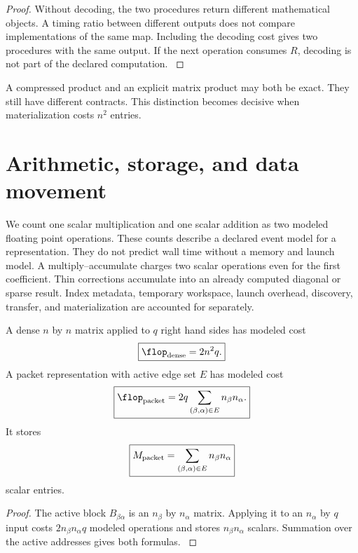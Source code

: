 \begin{proof}\label{main:proof:004}
Without decoding, the two procedures return different mathematical objects. A timing ratio between different outputs does not compare implementations of the same map. Including the decoding cost gives two procedures with the same output. If the next operation consumes \(R\), decoding is not part of the declared computation.
\label{main:proof:004:end}\end{proof}

\begin{remark}\label{main:remark:001}\label{rem:semantic_boundary}
A compressed product and an explicit matrix product may both be exact. They still have different contracts. This distinction becomes decisive when materialization costs \(n^2\) entries.
\end{remark}

\section{Arithmetic, storage, and data movement}\label{main:section:003}\label{sec:cost}

We count one scalar multiplication and one scalar addition as two modeled floating point operations. These counts describe a declared event model for a representation. They do not predict wall time without a memory and launch model. A multiply--accumulate charges two scalar operations even for the first coefficient. Thin corrections accumulate into an already computed diagonal or sparse result. Index metadata, temporary workspace, launch overhead, discovery, transfer, and materialization are accounted for separately.

\begin{theorem}\label{main:theorem:003}\label{thm:packet_counts}
A dense \(n\) by \(n\) matrix applied to \(q\) right hand sides has modeled cost
\[
\boxed{
\flop_{\rm dense}=2n^2q.
}
\]
A packet representation with active edge set \(E\) has modeled cost
\[
\boxed{
\flop_{\rm packet}
=
2q
\sum_{(\beta,\alpha)\in E}
n_\beta n_\alpha.
}
\]
It stores
\[
\boxed{
M_{\rm packet}
=
\sum_{(\beta,\alpha)\in E}
n_\beta n_\alpha
}
\]
scalar entries.
\end{theorem}

\begin{proof}\label{main:proof:005}
The active block \(B_{\beta\alpha}\) is an \(n_\beta\) by \(n_\alpha\) matrix. Applying it to an \(n_\alpha\) by \(q\) input costs \(2n_\beta n_\alpha q\) modeled operations and stores \(n_\beta n_\alpha\) scalars. Summation over the active addresses gives both formulas.
\label{main:proof:005:end}\end{proof}


